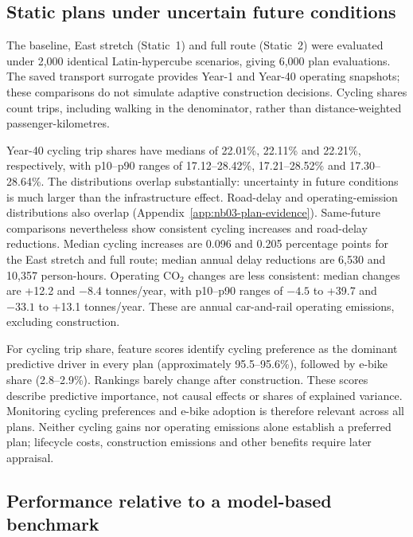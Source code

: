 \subsection{Static plans under uncertain future conditions}
\label{sec:nb03-static-comparison}

The baseline, East stretch (Static~1) and full route (Static~2) were evaluated under 2,000 identical Latin-hypercube scenarios, giving 6,000 plan evaluations. The saved transport surrogate provides Year-1 and Year-40 operating snapshots; these comparisons do not simulate adaptive construction decisions. Cycling shares count trips, including walking in the denominator, rather than distance-weighted passenger-kilometres.

Year-40 cycling trip shares have medians of 22.01\%, 22.11\% and 22.21\%, respectively, with p10--p90 ranges of 17.12--28.42\%, 17.21--28.52\% and 17.30--28.64\%. The distributions overlap substantially: uncertainty in future conditions is much larger than the infrastructure effect. Road-delay and operating-emission distributions also overlap (Appendix~\ref{app:nb03-plan-evidence}). Same-future comparisons nevertheless show consistent cycling increases and road-delay reductions. Median cycling increases are 0.096 and 0.205 percentage points for the East stretch and full route; median annual delay reductions are 6,530 and 10,357 person-hours. Operating CO$_2$ changes are less consistent: median changes are +12.2 and $-8.4$ tonnes/year, with p10--p90 ranges of $-4.5$ to +39.7 and $-33.1$ to +13.1 tonnes/year. These are annual car-and-rail operating emissions, excluding construction.

For cycling trip share, feature scores identify cycling preference as the dominant predictive driver in every plan (approximately 95.5--95.6\%), followed by e-bike share (2.8--2.9\%). Rankings barely change after construction. These scores describe predictive importance, not causal effects or shares of explained variance. Monitoring cycling preferences and e-bike adoption is therefore relevant across all plans. Neither cycling gains nor operating emissions alone establish a preferred plan; lifecycle costs, construction emissions and other benefits require later appraisal.

\subsection{Performance relative to a model-based benchmark}
\label{sec:nb03-vulnerability}

